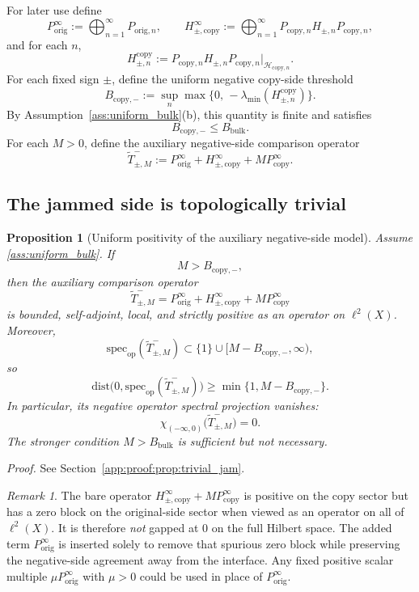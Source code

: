 \documentclass[11pt]{article}
\numberwithin{equation}{section}
\newtheorem{proposition}[theorem]{Proposition}
\theoremstyle{definition}
\theoremstyle{remark}
\newtheorem{remark}[theorem]{Remark}
\newcommand{\proofref}[1]{%
  \par\noindent\emph{Proof.} See Section~\ref{#1}.\par\medskip
}
\newcommand{\proofappendixref}[1]{\proofref{#1}}
\newcommand{\Hil}{\mathcal{H}}
\newcommand{\spec}{\mathrm{spec}}
\newcommand{\dist}{\mathrm{dist}}
\begin{document}
For later use define
\[
P_{\mathrm{orig}}^\infty:=\bigoplus_{n=1}^\infty P_{\mathrm{orig},n},
\qquad
H_{\pm,\mathrm{copy}}^\infty:=\bigoplus_{n=1}^\infty P_{\mathrm{copy},n}H_{\pm,n}P_{\mathrm{copy},n},
\]
and for each $n$,
\[
H_{\pm,n}^{\mathrm{copy}}
:=
P_{\mathrm{copy},n}H_{\pm,n}P_{\mathrm{copy},n}\big|_{\Hil_{\mathrm{copy},n}}.
\]
For each fixed sign $\pm$, define the uniform negative copy-side threshold
\[
B_{\mathrm{copy},-}
:=
\sup_n \max\bigl\{0,\,-\lambda_{\min}(H_{\pm,n}^{\mathrm{copy}})\bigr\}.
\]
By Assumption~\ref{ass:uniform_bulk}(b), this quantity is finite and satisfies
\[
B_{\mathrm{copy},-}\le B_{\mathrm{bulk}}.
\]
For each $M>0$, define the auxiliary negative-side comparison operator
\[
\widetilde T^-_{\pm,M}:=
P_{\mathrm{orig}}^\infty+H_{\pm,\mathrm{copy}}^\infty+MP_{\mathrm{copy}}^\infty.
\]

\subsection{The jammed side is topologically trivial}

\begin{proposition}[Uniform positivity of the auxiliary negative-side model]\label{prop:trivial_jam}
Assume \ref{ass:uniform_bulk}. If
\[
M>B_{\mathrm{copy},-},
\]
then the auxiliary comparison operator
\[
\widetilde T^-_{\pm,M}
=
P_{\mathrm{orig}}^\infty+H_{\pm,\mathrm{copy}}^\infty+MP_{\mathrm{copy}}^\infty
\]
is bounded, self-adjoint, local, and strictly positive as an operator on $\ell^2(X)$. Moreover,
\[
\spec_{\mathrm{op}}(\widetilde T^-_{\pm,M})\subset \{1\}\cup [M-B_{\mathrm{copy},-},\infty),
\]
so
\[
\dist\bigl(0,\spec_{\mathrm{op}}(\widetilde T^-_{\pm,M})\bigr)\ge
\min\{1,M-B_{\mathrm{copy},-}\}.
\]
In particular,
its negative operator spectral projection vanishes:
\[
\chi_{(-\infty,0)}\!\bigl(\widetilde T^-_{\pm,M}\bigr)=0.
\]
The stronger condition $M>B_{\mathrm{bulk}}$ is sufficient but not necessary.
\end{proposition}
\proofappendixref{app:proof:prop:trivial_jam}




\begin{remark}\label{rem:why_aux_negative}
The bare operator $H_{\pm,\mathrm{copy}}^\infty+MP_{\mathrm{copy}}^\infty$ is positive on the copy
sector but has a zero block on the original-side sector when viewed as an operator on all of
$\ell^2(X)$. It is therefore \emph{not} gapped at $0$ on the full Hilbert space. The added term
$P_{\mathrm{orig}}^\infty$ is inserted solely to remove that spurious zero block while preserving the
negative-side agreement away from the interface. Any fixed positive scalar multiple
$\mu P_{\mathrm{orig}}^\infty$ with $\mu>0$ could be used in place of
$P_{\mathrm{orig}}^\infty$.
\end{remark}
\end{document}
